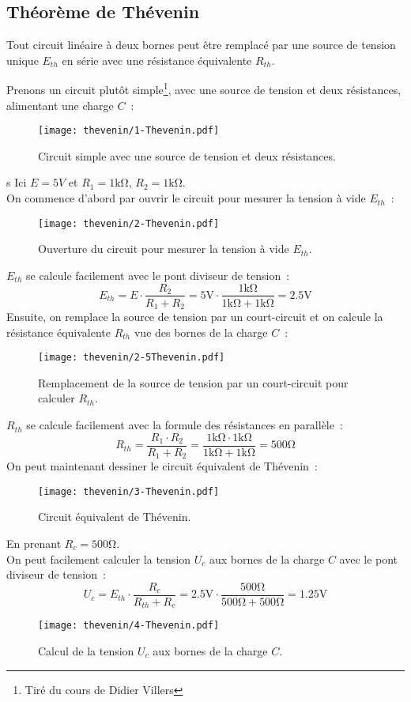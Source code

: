 \subsection{Th\'eor\`eme de Th\'evenin}
Tout circuit lin\'eaire à deux bornes peut \^etre remplac\'e par une source de tension unique \(E_{th}\) en s\'erie avec une r\'esistance \'equivalente \(R_{th}\).\par
Prenons un circuit plut\^ot simple\footnote{Tir\'e du cours de Didier Villers},
avec une source de tension et deux r\'esistances, alimentant une charge \(C\)~:
\begin{figure}[H]
    \centering
    \texttt{[image: thevenin/1-Thevenin.pdf]}
    \caption{Circuit simple avec une source de tension et deux r\'esistances.}
\end{figure}s
Ici \(E=5V\) et \(R_1=1\unit{\kilo\ohm}\), \(R_2=1\unit{\kilo\ohm}\).\\
On commence d'abord par ouvrir le circuit pour mesurer la tension à vide \(E_{th}\)~:
\begin{figure}[H]
    \centering
    \texttt{[image: thevenin/2-Thevenin.pdf]}
    \caption{Ouverture du circuit pour mesurer la tension à vide \(E_{th}\).}
\end{figure}
\(E_{th}\) se calcule facilement avec le pont diviseur de tension~:
\[
E_{th} = E \cdot \frac{R_2}{R_1+R_2} = 5\unit{\volt} \cdot \frac{1\unit{\kilo\ohm}}{1\unit{\kilo\ohm}+1\unit{\kilo\ohm}} = 2.5\unit{\volt}
\]
Ensuite, on remplace la source de tension par un court-circuit et on calcule la r\'esistance \'equivalente \(R_{th}\) vue des bornes de la charge \(C\)~:
\begin{figure}[H]
    \centering
    \texttt{[image: thevenin/2-5Thevenin.pdf]}
    \caption{Remplacement de la source de tension par un court-circuit pour calculer \(R_{th}\).}
\end{figure}
\(R_{th}\) se calcule facilement avec la formule des r\'esistances en parall\`ele~:
\[
R_{th} = \frac{R_1 \cdot R_2}{R_1 + R_2} = \frac{1\unit{\kilo\ohm} \cdot 1\unit{\kilo\ohm}}{1\unit{\kilo\ohm} + 1\unit{\kilo\ohm}} = 500\unit{\ohm}
\]
On peut maintenant dessiner le circuit \'equivalent de Th\'evenin~:
\begin{figure}[H]
    \centering
    \texttt{[image: thevenin/3-Thevenin.pdf]}
    \caption{Circuit \'equivalent de Th\'evenin.}
    \label{fig:thevenin-equivalent}
\end{figure}
En prenant \(R_c=500\unit{\ohm}\).\\
On peut facilement calculer la tension \(U_{c}\) aux bornes de la charge \(C\) avec le pont diviseur de tension~:
\[
U_{c} = E_{th} \cdot \frac{R_c}{R_{th} + R_c} = 2.5\unit{\volt} \cdot \frac{500\unit{\ohm}}{500\unit{\ohm} + 500\unit{\ohm}} = 1.25\unit{\volt}
\]
\begin{figure}[H]
    \centering
    \texttt{[image: thevenin/4-Thevenin.pdf]}
    \caption{Calcul de la tension \(U_{c}\) aux bornes de la charge \(C\).}
\end{figure}

